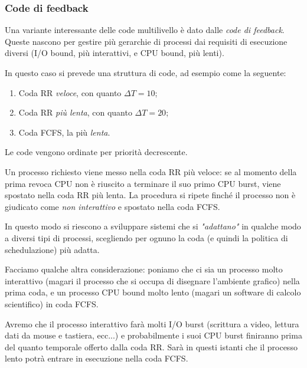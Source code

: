 \documentclass[a4paper,11pt]{article}
\begin{document}
\subsubsection{Code di feedback}
Una variante interessante delle code multilivello è dato dalle \textit{code di feedback}.
Queste nascono per gestire più gerarchie di processi dai requisiti di esecuzione diversi (I/O bound, più interattivi, e CPU bound, più lenti).

In questo caso si prevede una struttura di code, ad esempio come la seguente:
\begin{enumerate}
	\item Coda RR \textit{veloce}, con quanto $\Delta T = 10$;
	\item Coda RR \textit{più lenta}, con quanto $\Delta T = 20$;
	\item Coda FCFS, la più \textit{lenta}.
\end{enumerate}
Le code vengono ordinate per priorità decrescente.

Un processo richiesto viene messo nella coda RR più veloce: se al momento della prima revoca CPU non è riuscito a terminare il suo primo CPU burst, viene spostato nella coda RR più lenta.
La procedura si ripete finché il processo non è giudicato come \textit{non interattivo} e spostato nella coda FCFS.

In questo modo si riescono a sviluppare sistemi che si \textit{"adattano"} in qualche modo a diversi tipi di processi, scegliendo per ognuno la coda (e quindi la politica di schedulazione) più adatta.

\par\smallskip

Facciamo qualche altra considerazione: poniamo che ci sia un processo molto interattivo (magari il processo che si occupa di disegnare l'ambiente grafico) nella prima coda, e un processo CPU bound molto lento (magari un software di calcolo scientifico) in coda FCFS.

Avremo che il processo interattivo farà molti I/O burst (scrittura a video, lettura dati da mouse e tastiera, ecc...) e probabilmente i suoi CPU burst finiranno prima del quanto temporale offerto dalla coda RR.
Sarà in questi istanti che il processo lento potrà entrare in esecuzione nella coda FCFS.

\par\smallskip
\end{document}
